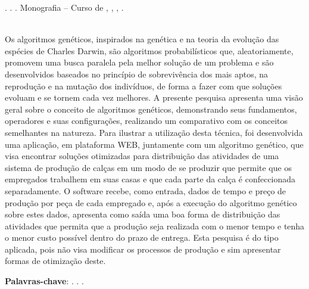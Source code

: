
\begin{OnehalfSpacing} 

\noindent \imprimirAutorCitacaoMaiuscula. {\bfseries\imprimirtitulo}. {\imprimirdata}.  Monografia -- Curso de {\MakeUppercase\imprimircurso}, {\imprimirinstituicao}, {\imprimirlocal}, {\imprimirdata}.

\vspace{\onelineskip}
\vspace{\onelineskip}
\vspace{\onelineskip}
\vspace{\onelineskip}

\begin{resumo}
~\\
\noindent Os algoritmos genéticos, inspirados na genética e na teoria da evolução das espécies de Charles Darwin,
são algoritmos probabilísticos que, aleatoriamente, promovem uma busca paralela pela melhor solução de um problema e são 
desenvolvidos baseados no princípio de sobrevivência dos mais aptos, na reprodução e na mutação dos indivíduos, de forma a fazer com 
que soluções evoluam e se tornem cada vez melhores. A presente pesquisa apresenta uma visão geral sobre
o conceito de algoritmos genéticos, demonstrando seus fundamentos, operadores e suas configurações, realizando um comparativo 
com os conceitos semelhantes na natureza. Para ilustrar a utilização desta técnica, foi desenvolvida uma aplicação, 
em plataforma WEB, juntamente com um algoritmo genético, que visa encontrar soluções otimizadas para distribuição 
das atividades de uma sistema de produção de calças em um modo de se produzir que permite que os empregados trabalhem em suas 
casas e que cada parte da calça é confeccionada separadamente. O software recebe, como entrada, dados de tempo e preço
de produção por peça de cada empregado e, após a execução do algoritmo genético sobre estes dados, apresenta como saída uma 
boa forma de distribuição das atividades que permita que a produção seja realizada com o menor tempo e tenha o menor custo possível 
dentro do prazo de entrega. Esta pesquisa é do tipo aplicada, pois não visa modificar os processos de produção e sim apresentar 
formas de otimização deste.

\vspace{\onelineskip}
\vspace*{\fill}
\noindent \textbf{Palavras-chave}: \imprimirPalavraChaveUm. \imprimirPalavraChaveDois. \imprimirPalavraChaveTres.
\vspace{\onelineskip}
\end{resumo}

\end{OnehalfSpacing}
